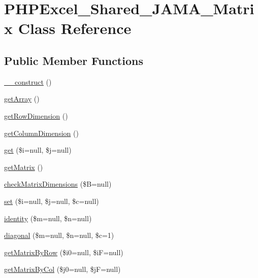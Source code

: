 \hypertarget{classPHPExcel__Shared__JAMA__Matrix}{}\section{P\+H\+P\+Excel\+\_\+\+Shared\+\_\+\+J\+A\+M\+A\+\_\+\+Matrix Class Reference}
\label{classPHPExcel__Shared__JAMA__Matrix}
\subsection*{Public Member Functions}
\begin{DoxyCompactItemize}
\item 
\hyperlink{classPHPExcel__Shared__JAMA__Matrix_aba5174bf4280772f3898d7107861e434}{\+\_\+\+\_\+construct} ()
\item 
\hyperlink{classPHPExcel__Shared__JAMA__Matrix_abd530435c8f01840e99477ca304ddf66}{get\+Array} ()
\item 
\hyperlink{classPHPExcel__Shared__JAMA__Matrix_a1f7e144d06f8b8580fd7b0f7babec6c9}{get\+Row\+Dimension} ()
\item 
\hyperlink{classPHPExcel__Shared__JAMA__Matrix_a9af1ceb781e188c8be5bf57642f804f2}{get\+Column\+Dimension} ()
\item 
\hyperlink{classPHPExcel__Shared__JAMA__Matrix_a354cf61890ea549705944d5e0a6d11d2}{get} (\$i=null, \$j=null)
\item 
\hyperlink{classPHPExcel__Shared__JAMA__Matrix_a8e5bbd7908f8873f5a2b930afa2c8c28}{get\+Matrix} ()
\item 
\hyperlink{classPHPExcel__Shared__JAMA__Matrix_ae8940d9b441c56736d17fa613cf9baf4}{check\+Matrix\+Dimensions} (\$B=null)
\item 
\hyperlink{classPHPExcel__Shared__JAMA__Matrix_a68cfe9ae6de88f4ecc254e1e0a6963ce}{set} (\$i=null, \$j=null, \$c=null)
\item 
\hyperlink{classPHPExcel__Shared__JAMA__Matrix_a40bd2a693f84deb24f7a89f3049e419b}{identity} (\$m=null, \$n=null)
\item 
\hyperlink{classPHPExcel__Shared__JAMA__Matrix_a4173cb2486ae57182024ded14265e04b}{diagonal} (\$m=null, \$n=null, \$c=1)
\item 
\hyperlink{classPHPExcel__Shared__JAMA__Matrix_a1626a70ce967863a03f91c5427f52139}{get\+Matrix\+By\+Row} (\$i0=null, \$iF=null)
\item 
\hyperlink{classPHPExcel__Shared__JAMA__Matrix_af806848a592c0812fcf6677f4f283f20}{get\+Matrix\+By\+Col} (\$j0=null, \$jF=null)

\end{DoxyCompactItemize}
